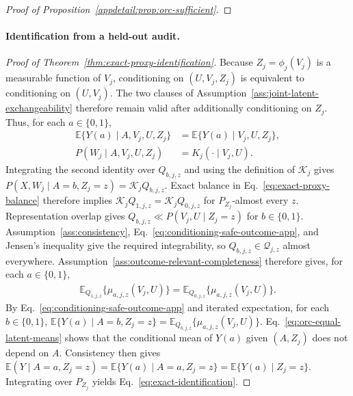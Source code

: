 \begin{proof}[Proof of Proposition~\ref{appdetail:prop:orc-sufficient}]
\end{proof}

\paragraph{Identification from a held-out audit.}
\begin{proof}[Proof of Theorem~\ref{thm:exact-proxy-identification}]
Because $Z_j=\phi_j(V_j)$ is a measurable function of $V_j$, conditioning on $(U,V_j,Z_j)$ is equivalent to conditioning on $(U,V_j)$. The two clauses of Assumption~\ref{ass:joint-latent-exchangeability} therefore remain valid after additionally conditioning on $Z_j$. Thus, for each $a\in\{0,1\}$,
\begin{align}
\mathbb E\{Y(a)\mid A,V_j,U,Z_j\}
&=
\mathbb E\{Y(a)\mid V_j,U,Z_j\},
\label{eq:conditioning-safe-outcome-app}\\
 P(W_j\mid A,V_j,U,Z_j)
&=
K_j(\cdot\mid V_j,U).
\nonumber
\end{align}
Integrating the second identity over $Q_{b,j,z}$ and using the definition of $\mathcal K_j$ gives
\( P(X,W_j\mid A=b,Z_j=z) = \mathcal K_jQ_{b,j,z}.\)
Exact balance in Eq.~\eqref{eq:exact-proxy-balance} therefore implies
\(\mathcal K_jQ_{1,j,z}=\mathcal K_jQ_{0,j,z}\)
for $P_{Z_j}$-almost every $z$. Representation overlap gives $Q_{b,j,z}\ll P(V_j,U\mid Z_j=z)$ for $b\in\{0,1\}$. Assumption~\ref{ass:consistency}, Eq.~\eqref{eq:conditioning-safe-outcome-app}, and Jensen's inequality give the required integrability, so $Q_{b,j,z}\in\mathcal Q_{j,z}$ almost everywhere. Assumption~\ref{ass:outcome-relevant-completeness} therefore gives, for each $a\in\{0,1\}$,
\begin{align}
\mathbb E_{Q_{1,j,z}}\{\mu_{a,j,z}(V_j,U)\}
=
\mathbb E_{Q_{0,j,z}}\{\mu_{a,j,z}(V_j,U)\}.
\label{eq:orc-equal-latent-means}
\end{align}
By Eq.~\eqref{eq:conditioning-safe-outcome-app} and iterated expectation, for each $b\in\{0,1\}$,
\(\mathbb E\{Y(a)\mid A=b,Z_j=z\} = \mathbb E_{Q_{b,j,z}}\{\mu_{a,j,z}(V_j,U)\}.\)
Eq.~\eqref{eq:orc-equal-latent-means} shows that the conditional mean of $Y(a)$ given $(A,Z_j)$ does not depend on $A$. Consistency then gives
\(\mathbb E(Y\mid A=a,Z_j=z) = \mathbb E\{Y(a)\mid A=a,Z_j=z\} = \mathbb E\{Y(a)\mid Z_j=z\}.\)
Integrating over $P_{Z_j}$ yields Eq.~\eqref{eq:exact-identification}.\qedhere
\end{proof}

